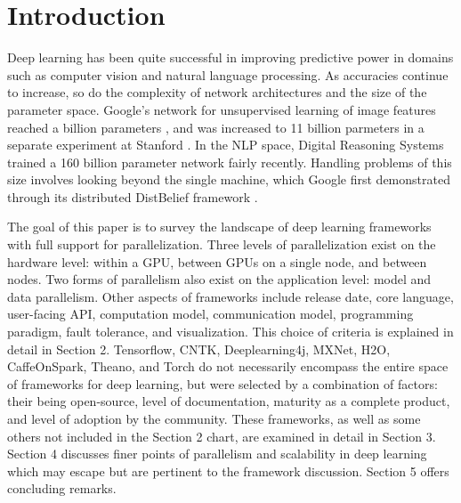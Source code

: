 \section{Introduction}
Deep learning has been quite successful in improving predictive power in domains such as computer vision and natural language processing. As accuracies continue to  increase, so do the complexity of network architectures and the size of the parameter space. Google's network for unsupervised learning of image features reached a billion parameters \cite{donahue2014decaf}, and was increased to 11 billion parmeters in a separate experiment at Stanford \cite{schmidhuber2015deep}. In the NLP space, Digital Reasoning Systems trained a 160 billion parameter network \cite{trask2015modeling} fairly recently. Handling problems of this size involves looking beyond the single machine, which Google first demonstrated through its distributed DistBelief framework \cite{dean2012large}.

The goal of this paper is to survey the landscape of deep learning frameworks with full support for parallelization. Three levels of parallelization exist on the hardware level: within a GPU, between GPUs on a single node, and between nodes. Two forms of parallelism also exist on the application level: model and data parallelism. Other aspects of frameworks include release date, core language, user-facing API, computation model, communication model, programming paradigm, fault tolerance, and visualization. This choice of criteria is explained in detail in Section 2. Tensorflow, CNTK, Deeplearning4j, MXNet, H2O, CaffeOnSpark, Theano, and Torch do not necessarily encompass the entire space of frameworks for deep learning, but were selected by a combination of factors: their being open-source, level of documentation, maturity as a complete product, and level of adoption by the community. These frameworks, as well as some others not included in the Section 2 chart, are examined in detail in Section 3. Section 4 discusses finer points of parallelism and scalability in deep learning which may escape but are pertinent to the framework discussion. Section 5 offers concluding remarks.